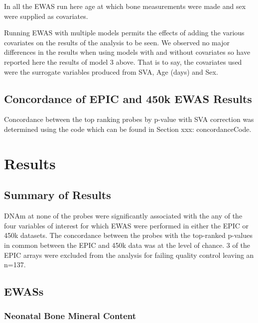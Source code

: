 \documentclass[]{book}
\begin{document}
In all the EWAS run here age at which bone measurements were made and sex were supplied as covariates.

Running EWAS with multiple models permits the effects of adding the various covariates on the results of the analysis to be seen. We observed no major differences in the results when using models with and without covariates so have reported here the results of model 3 above. That is to say, the covariates used were the surrogate variables produced from SVA, Age (days) and Sex.

\hypertarget{concordance-of-epic-and-450k-ewas-results}{%
\subsection{Concordance of EPIC and 450k EWAS Results}\label{concordance-of-epic-and-450k-ewas-results}}

Concordance between the top ranking probes by p-value with SVA correction was determined using the code which can be found in Section xxx: concordanceCode.

\hypertarget{results}{%
\section{Results}\label{results}}

\hypertarget{summary-of-results}{%
\subsection{Summary of Results}\label{summary-of-results}}

DNAm at none of the probes were significantly associated with the any of the four variables of interest for which EWAS were performed in either the EPIC or 450k datasets. The concordance between the probes with the top-ranked p-values in common between the EPIC and 450k data was at the level of chance. 3 of the EPIC arrays were excluded from the analysis for failing quality control leaving an n=137.

\hypertarget{ewass}{%
\subsection{EWASs}\label{ewass}}

\hypertarget{neonatal-bone-mineral-content}{%
\subsubsection{Neonatal Bone Mineral Content}\label{neonatal-bone-mineral-content}}
\end{document}
